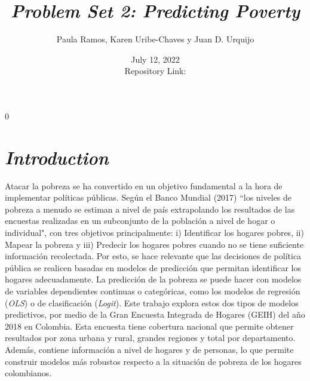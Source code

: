 \documentclass[11pt]{article}
\newcommand{\blind}{0}
\renewcommand{\baselinestretch}{0.8}
\begin{document}
		
		\def\spacingset#1{\renewcommand{\baselinestretch}%
			{#1}\small\normalsize} \spacingset{0.8}
		
		\blind
		{
			\title{\bf \emph{Problem Set 2: Predicting Poverty}}
\author{Paula Ramos, Karen Uribe-Chaves y Juan D. Urquijo} 
\date{July 12, 2022 \\ Repository Link:\href{https://github.com/KarenUC/ProblemSet2_Ramos_Uribe_Urquijo} {\color{blue}{\it Github}}}
			}

   		\maketitle
   		\spacingset{0.85}	

\section{\bf \emph {Introduction}} \label{sec:intro}

\justify
Atacar la pobreza se ha convertido en un objetivo fundamental a la hora de implementar políticas públicas. Según el Banco Mundial (2017) ``los niveles de pobreza a menudo se estiman a nivel de país extrapolando los resultados de las encuestas realizadas en un subconjunto de la población a nivel de hogar o individual", con tres objetivos principalmente: i) Identificar los hogares pobres, ii) Mapear la pobreza y iii) Predecir los hogares pobres cuando no se tiene suficiente información recolectada.  Por esto, se hace relevante que las decisiones de política pública se realicen basadas en modelos de predicción que permitan identificar los hogares adecuadamente.
\justify
La predicción de la pobreza se puede hacer con modelos de variables dependientes continuas o categóricas, como los modelos de regresión (\emph{OLS}) o de clasificación (\emph{Logit}). Este trabajo explora estos dos tipos de modelos predictivos, por medio de la Gran Encuesta Integrada de Hogares (GEIH) del año 2018 en Colombia. Esta encuesta  tiene cobertura nacional que permite obtener resultados por zona urbana y rural, grandes regiones y total por departamento. Además, contiene información a nivel de hogares y de personas, lo que permite construir modelos más robustos respecto a la situación de pobreza de los hogares colombianos.
\end{document}
